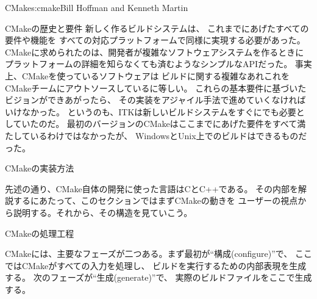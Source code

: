 \begin{aosachapter}{CMake}{s:cmake}{Bill Hoffman and Kenneth Martin}
\begin{aosasect1}{CMakeの歴史と要件}
新しく作るビルドシステムは、
これまでにあげたすべての要件や機能を
すべての対応プラットフォームで同様に実現する必要があった。
CMakeに求められたのは、開発者が複雑なソフトウェアシステムを作るときに
プラットフォームの詳細を知らなくても済むようなシンプルなAPIだった。
事実上、CMakeを使っているソフトウェアは
ビルドに関する複雑なあれこれを
CMakeチームにアウトソースしているに等しい。
これらの基本要件に基づいたビジョンができあがったら、
その実装をアジャイル手法で進めていくなければいけなかった。
というのも、ITKは新しいビルドシステムをすぐにでも必要としていたのだ。
最初のバージョンのCMakeはここまでにあげた要件をすべて満たしているわけではなかったが、
WindowsとUnix上でのビルドはできるものだった。

\end{aosasect1}

\begin{aosasect1}{CMakeの実装方法}

先述の通り、CMake自体の開発に使った言語はCとC++である。
その内部を解説するにあたって、このセクションではまずCMakeの動きを
ユーザーの視点から説明する。それから、その構造を見ていこう。

\begin{aosasect2}{CMakeの処理工程}

CMakeには、主要なフェーズが二つある。まず最初が``構成(configure)''で、
ここではCMakeがすべての入力を処理し、
ビルドを実行するための内部表現を生成する。
次のフェーズが``生成(generate)''で、
実際のビルドファイルをここで生成する。


\end{aosasect2}
\end{aosasect1}
\end{aosachapter}

